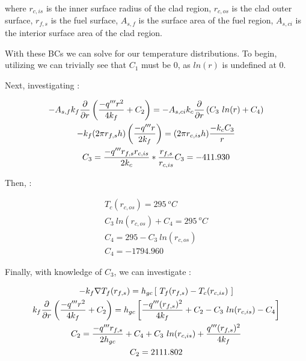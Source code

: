 \documentclass{article}
\begin{document}
where $r_{c,is}$ is the inner surface radius of the clad region, $r_{c,os}$ is the clad outer surface, $r_{f,s}$ is the fuel surface, $A_{s,f}$ is the surface area of the fuel region, $A_{s,ci}$ is the interior surface area of the clad region.

\newpage
With these BCs we can solve for our temperature distributions. To begin, utilizing  we can trivially see that $C_1$ must be 0, as $ln(r)$ is undefined at 0. 

Next, investigating :

\begin{equation}
    \begin{gathered}
        -A_{s,f}k_f \frac{\partial }{\partial r}\left(\frac{-q'''r^2}{4k_f} + C_2\right) = 
        -A_{s,ci}k_c \frac{\partial }{\partial r}\left(C_3 \ ln(r) + C_4\right) \\
        -k_f (2\pi r_{f,s}h)\left(\frac{-q'''r}{2k_f} \right) = (2\pi r_{c,is}h)\frac{-k_c C_3}{r}\\
        C_3 = \frac{-q'''r_{f,s}r_{c,is}}{2k_c} * \frac{r_{f,s}}{r_{c,is}}
        C_3 = -411.930
    \end{gathered}
\end{equation}

Then, :

\begin{equation}
    \begin{gathered}
        T_c(r_{c,os}) = 295 \ ^oC \\
        C_3 \ ln(r_{c,os}) + C_4 = 295 \ ^oC\\
        C_4 = 295 - C_3 \ ln(r_{c,os}) \\
        C_4 = -1794.960
    \end{gathered}
\end{equation}

Finally, with knowledge of $C_3$, we can investigate :

\begin{equation}
    \begin{gathered}
        -k_f \nabla T_f(r_{f,s}) = h_{gc} \left[\ T_f(r_{f,s}) - T_c(r_{c,is})\ \right]\\
        k_f \partia{}{r}\left(\frac{-q'''r^2}{4k_f} + C_2\right) = 
        h_{gc} \left[\frac{-q'''(r_{f,s})^2}{4k_f} + C_2 - C_3 \ ln(r_{c,is}) - C_4 \right] \\
        C_2 = \frac{-q'''r_{f,s}}{2h_{gc}} + C_4 + C_3\ ln(r_{c,is}) + \frac{q'''(r_{f,s})^2}{4k_f}\\
        C_2 = 2111.802
    \end{gathered}
\end{equation}
\end{document}
